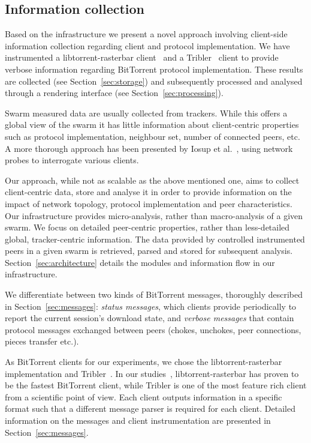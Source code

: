 \subsection{Information collection}

Based on the infrastructure we present a novel approach involving client-side
information collection regarding client and protocol implementation. We have
instrumented a libtorrent-rasterbar client~\cite{libtorrent} and a
Tribler~\cite{tribler} client to provide verbose information regarding
BitTorrent protocol implementation.  These results are collected (see
Section~\ref{sec:storage}) and subsequently processed and analysed through a
rendering interface (see Section~\ref{sec:processing}).

Swarm measured data are usually collected from trackers. While this offers a
global view of the swarm it has little information about client-centric
properties such as protocol implementation, neighbour set, number of connected
peers, etc. A more thorough approach has been presented by Iosup et
al.~\cite{mprobe}, using network probes to interrogate various clients.

Our approach, while not as scalable as the above mentioned one, aims to collect
client-centric data, store and analyse it in order to provide information on
the impact of network topology, protocol implementation and peer
characteristics. Our infrastructure provides micro-analysis, rather than
macro-analysis of a given swarm. We focus on detailed peer-centric properties,
rather than less-detailed global, tracker-centric information. The data
provided by controlled instrumented peers in a given swarm is retrieved,
parsed and stored for subsequent analysis. Section~\ref{sec:architecture}
details the modules and information flow in our infrastructure.

We differentiate between two kinds of BitTorrent messages, thoroughly
described in Section~\ref{sec:messages}: \textit{status messages}, which
clients provide periodically to report the current session’s download state,
and \textit{verbose messages} that contain protocol messages exchanged between
peers (chokes, unchokes, peer connections, pieces transfer etc.).

As BitTorrent clients for our experiments, we chose the
libtorrent-rasterbar~\cite{libtorrent} implementation and
Tribler~\cite{tribler}. In our studies~\cite{bt-vi}, libtorrent-rasterbar has
proven to be the fastest BitTorrent client, while Tribler is one of the most
feature rich client from a scientific point of view. Each client outputs
information in a specific format such that a different message parser is
required for each client. Detailed information on the messages and client
instrumentation are presented in Section~\ref{sec:messages}.

